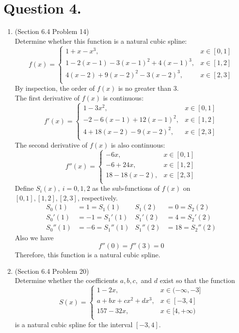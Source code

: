 \documentclass[10pt]{report}
\begin{document}
\section*{Question 4.}
\begin{enumerate}
	\item 
	(Section 6.4 Problem 14)\\
	Determine whether this function is a natural cubic spline:
	\[
	f(x) = 
	\begin{cases}
		1+x-x^3, &x\in [0,1]\\
		1-2(x-1)-3(x-1)^2+4(x-1)^3, &x\in [1,2]\\
		4(x-2)+9(x-2)^2-3(x-2)^3, &x\in [2,3]\\
	\end{cases}
	\]
	By inspection, the order of $f(x)$ is no greater than 3.\\
	The first derivative of $f(x)$ is continuous:
	\[
	f'(x) = 
	\begin{cases}
	1-3x^2, &x\in [0,1]\\
	-2-6(x-1)+12(x-1)^2, &x\in [1,2]\\
	4+18(x-2)-9(x-2)^2, &x\in [2,3]\\
	\end{cases}
	\]
	The second derivative of $f(x)$ is also continuous:
	\[
	f''(x) = 
	\begin{cases}
	-6x, &x\in [0,1]\\
	-6+24x, &x\in [1,2]\\
	18-18(x-2), &x\in [2,3]\\
	\end{cases}
	\]
	Define $S_i(x),\ i=0,1,2$ as the sub-functions of $f(x)$ on $[0,1], [1,2], [2,3]$, respectively.
	\begin{align*}
		S_0(1) &= 1 = S_1(1) & S_1(2) &= 0 =S_2(2)\\
		S_0'(1) &= -1 = S_1'(1) & S_1'(2) &= 4 =S_2'(2)\\
		S_0''(1) &= -6 = S_1''(1) & S_1''(2) &= 18 =S_2''(2)
	\end{align*}
	Also we have
	\[
	f''(0) = f''(3) = 0
	\]
	Therefore, this function is a natural cubic spline.
	
	\item 
	(Section 6.4 Problem 20)\\
	Determine whether the coefficients $a, b, c,$ and $d$ exist so that the function
	\[
	S(x) = 
	\begin{cases}
	1-2x, &x\in (-\infty,-3]\\
	a+bx+cx^2+dx^3, &x\in [-3,4]\\
	157-32x, &x\in [4,+\infty)\\
	\end{cases}
	\]
	is a natural cubic spline for the interval $[-3, 4]$.
	

\end{enumerate}
\end{document}
